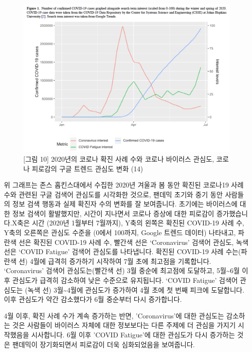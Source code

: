 \documentclass[
  letterpaper,
]{book}
\begin{document}
\begin{figure}[H]

{\centering \includegraphics{img/fig10.png}

}

\caption{{[}그림 10{]} 2020년의 코로나 확진 사례 수와 코로나 바이러스
관심도, 코로나 피로감의 구글 트렌드 관심도 변화 (14)}

\end{figure}%

위 그래프는 존스 홉킨스대에서 수집한 2020년 겨울과 봄 동안 확진된
코로나19 사례 수와 관련된 구글 검색어 관심도를 시각화한 것으로, 팬데믹
초기와 중기 동안 사람들의 정보 검색 행동과 실제 확진자 수의 변화를 잘
보여줍니다. 초기에는 바이러스에 대한 정보 검색이 활발했지만, 시간이
지나면서 코로나 증상에 대한 피로감이 증가했습니다.X축은 시간 (2020년
1월부터 7월까지), Y축의 왼쪽은 확진된 COVID-19 사례 수, Y축의 오른쪽은
관심도 수준을 (0에서 100까지, Google 트렌드 데이터) 나타내고, 파란색
선은 확진된 COVID-19 사례 수, 빨간색 선은 `Coronavirus' 검색어 관심도,
녹색 선은 `COVID Fatigue' 검색어 관심도를 나타냅니다. 확진된 COVID-19
사례 수는(파란색 선) 4월에 급격히 증가하기 시작하여 7월 초에 최고점을
기록합니다. `Coronavirus' 검색어 관심도는(빨간색 선) 3월 중순에 최고점에
도달하고, 5월\textasciitilde6월 이후 관심도가 급격히 감소하여 낮은
수준으로 유지됩니다. `COVID Fatigue' 검색어 관심도는 (녹색 선)
3월\textasciitilde4월에 관심도가 증가하여 4월 초에 첫 번째 피크에
도달합니다. 이후 관심도가 약간 감소했다가 6월 중순부터 다시 증가합니다.

4월 이후, 확진 사례 수가 계속 증가하는 반면, 'Coronavirus'에 대한
관심도는 감소하는 것은 사람들이 바이러스 자체에 대한 정보보다는 다른
주제에 더 관심을 가지기 시작했음을 시사합니다. 6월 이후 'COVID
Fatigue'에 대한 관심도가 다시 증가하는 것은 팬데믹이 장기화되면서
피로감이 더욱 심화되었음을 보여줍니다.
\end{document}
